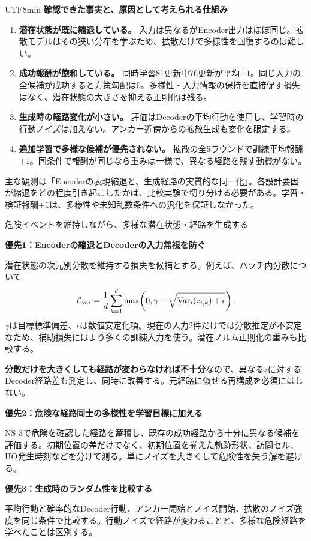 \documentclass[a4paper,11pt]{article}
\newcommand{\pageheading}[2]{\clearpage{\Large\bfseries\color{navy}#1}\par{\color{accent}#2}\par\vspace{3mm}}
\newcommand{\note}[1]{\par\colorbox{pale}{\parbox{0.94\linewidth}{#1}}\par}
\begin{document}
\begin{CJK*}{UTF8}{min}
\textbf{確認できた事実と、原因として考えられる仕組み}
\begin{enumerate}
\item \textbf{潜在状態が既に縮退している。} 入力は異なるがEncoder出力はほぼ同じ。拡散モデルはその狭い分布を学ぶため、拡散だけで多様性を回復するのは難しい。
\item \textbf{成功報酬が飽和している。} 同時学習81更新中76更新が平均$+1$。同じ入力の全候補が成功すると方策勾配は0。多様性・入力情報の保持を直接促す損失はなく、潜在状態の大きさを抑える正則化は残る。
\item \textbf{生成時の経路変化が小さい。} 評価はDecoderの平均行動を使用し、学習時の行動ノイズは加えない。アンカー近傍からの拡散生成も変化を限定する。
\item \textbf{追加学習で多様な候補が優先されない。} 拡散の全5ラウンドで訓練平均報酬$+1$。同条件で報酬が同じなら重みは一様で、異なる経路を残す動機がない。
\end{enumerate}
\note{主な観測は「Encoderの表現縮退と、生成経路の実質的な同一化」。各設計要因が縮退をどの程度引き起こしたかは、比較実験で切り分ける必要がある。学習・検証報酬$+1$は、多様性や未知乱数条件への汎化を保証しなかった。}

\pageheading{9. 改善案と次の比較実験}{危険イベントを維持しながら、多様な潜在状態・経路を生成する}
\textbf{優先1：Encoderの縮退とDecoderの入力無視を防ぐ}

潜在状態の次元別分散を維持する損失を候補とする。例えば、バッチ内分散について
\[
 \mathcal L_{\rm var}=\frac{1}{d}\sum_{k=1}^{d}
 \max\!\left(0,\gamma-\sqrt{\operatorname{Var}_{i}(z_{i,k})+\epsilon}\right).
\]
$\gamma$は目標標準偏差、$\epsilon$は数値安定化項。現在の入力2件だけでは分散推定が不安定なため、補助損失にはより多くの訓練入力を使う。潜在ノルム正則化の重みも比較する。

\textbf{分散だけを大きくしても経路が変わらなければ不十分}なので、異なる$z$に対するDecoder経路差も測定し、同時に改善する。元経路に似せる再構成を必須にはしない。

\textbf{優先2：危険な経路同士の多様性を学習目標に加える}

NS-3で危険を確認した経路を蓄積し、既存の成功経路から十分に異なる候補を評価する。初期位置の差だけでなく、初期位置を揃えた軌跡形状、訪問セル、HO発生時刻などを分けて測る。単にノイズを大きくして危険性を失う解を避ける。

\textbf{優先3：生成時のランダム性を比較する}

平均行動と確率的なDecoder行動、アンカー開始とノイズ開始、拡散のノイズ強度を同じ条件で比較する。行動ノイズで経路が変わることと、多様な危険経路を学べたことは区別する。


\end{CJK*}
\end{document}
